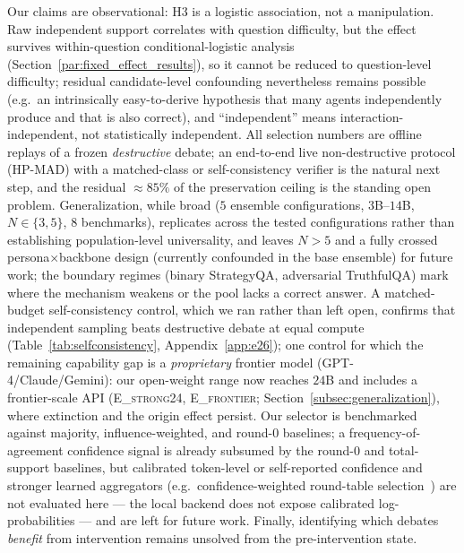 Our claims are observational: H3 is a logistic association, not a manipulation. Raw independent support
correlates with question difficulty, but the effect survives within-question conditional-logistic analysis
(Section~\ref{par:fixed_effect_results}), so it cannot be reduced to question-level difficulty; residual
candidate-level confounding nevertheless remains possible (e.g.\ an intrinsically easy-to-derive hypothesis
that many agents independently produce and that is also correct), and ``independent'' means
interaction-independent, not statistically independent. All selection numbers are offline replays of a frozen
\emph{destructive} debate; an end-to-end live non-destructive protocol (HP-MAD) with a matched-class or
self-consistency verifier is the natural next step, and the residual $\approx 85\%$ of the preservation
ceiling is the standing open problem. Generalization, while broad ($5$ ensemble configurations, $3$B--$14$B,
$N\in\{3,5\}$, $8$ benchmarks), replicates across the tested configurations rather than establishing
population-level universality, and leaves $N>5$ and a fully crossed persona$\times$backbone design (currently
confounded in the base ensemble) for future work; the boundary regimes (binary StrategyQA, adversarial
TruthfulQA) mark where the mechanism weakens or the pool lacks a correct answer. A matched-budget
self-consistency control, which we ran rather than left open, confirms that independent sampling beats
destructive debate at equal compute (Table~\ref{tab:selfconsistency}, Appendix~\ref{app:e26}); one control
for which the remaining capability gap is a \emph{proprietary} frontier model (GPT-4/Claude/Gemini): our
open-weight range now reaches $24$B and includes a frontier-scale API (\textsc{E\_strong24}, \textsc{E\_frontier};
Section~\ref{subsec:generalization}), where extinction and the origin effect persist. Our selector is
benchmarked against majority, influence-weighted, and round-$0$ baselines; a frequency-of-agreement
confidence signal is already subsumed by the round-$0$ and total-support baselines, but calibrated
token-level or self-reported confidence and stronger learned aggregators (e.g.\ confidence-weighted
round-table selection~\cite{chen2024reconcile}) are not evaluated here --- the local backend does not expose
calibrated log-probabilities --- and are left for future work. Finally,
identifying which debates \emph{benefit} from intervention remains unsolved from the pre-intervention state.


